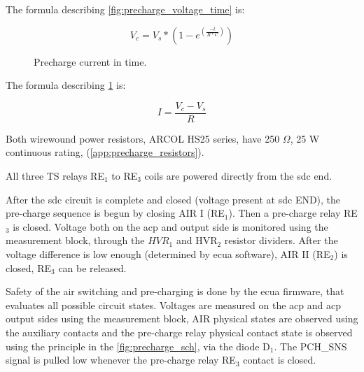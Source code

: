 The formula describing \ref{fig:precharge_voltage_time} is:

\begin{equation}
	V_{c}=V_{s}*(1-e^{(\frac{-t}{R*C})})
	\label{eq:precharge_voltage}
\end{equation}

\begin{figure}
	\caption{Precharge current in time.}
	\label{fig:precharge_current_time}
\end{figure}

The formula describing \ref{fig:precharge_current_time} is:

\begin{equation}
	I=\frac{V_{c}-V_{s}}{R}	
	\label{eq:precharge_current}
\end{equation}


Both wirewound power resistors, ARCOL HS25 series, have 250 $\Omega$, 25 W continuous rating, (\ref{app:precharge_resistors}).

All three TS relays RE$_1$ to RE$_3$ coils are powered directly from the \gls{sdc} end.

After the \gls{sdc} circuit is complete and closed (voltage present at \gls{sdc} END), the pre-charge sequence is begun by closing AIR I (RE$_1$). Then a pre-charge relay RE$_3$ is closed. Voltage both on the \gls{acp} and output side is monitored using the measurement block, through the $HVR_1$ and HVR$_2$ resistor dividers. After the voltage difference is low enough (determined by \gls{ecua} software), AIR II (RE$_2$) is closed, RE$_3$ can be released.

Safety of the \gls{air} switching and pre-charging is done by the \gls{ecua} firmware, that evaluates all possible circuit states. Voltages are measured on the \gls{acp} and \gls{acp} output sides using the measurement block, AIR physical states are observed using the auxiliary contacts and the pre-charge relay physical contact state is observed using the principle in the \ref{fig:precharge_sch}, via the diode D$_1$. The PCH\_SNS signal is pulled low whenever the pre-charge relay RE$_3$ contact is closed.

